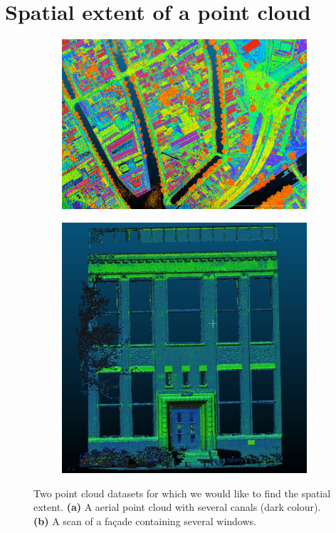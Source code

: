 
\graphicspath{{spatialextent/}}

\chapter{Spatial extent of a point cloud}
\label{chap:spatialextent}

\begin{figure}[h]
  \centering
  \begin{subfigure}[b]{0.57\linewidth}
    \centering
    \includegraphics[width=\textwidth]{figs/ahn3-water.png}
    \caption{}
  \end{subfigure}%
  \qquad
  \begin{subfigure}[b]{0.37\linewidth}
    \centering
    \includegraphics[page=2,width=\textwidth]{figs/facade.jpg}
    \caption{}
  \end{subfigure}
\caption{Two point cloud datasets for which we would like to find the spatial extent. \textbf{(a)} A aerial point cloud with several canals (dark colour). \textbf{(b)} A scan of a façade containing several windows.}
\label{fig:examples}  
\end{figure}


